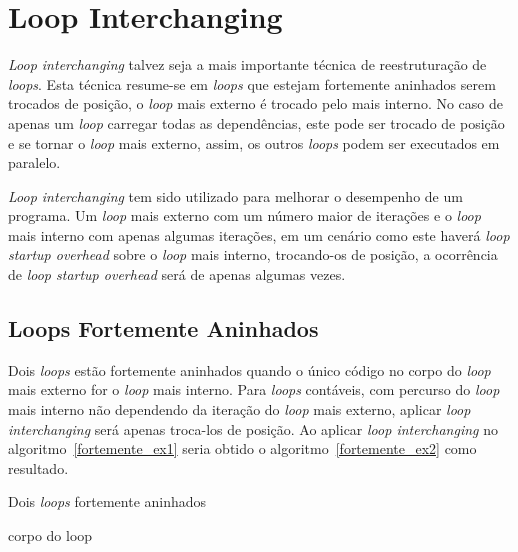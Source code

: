 \section{Loop Interchanging}

\textit{Loop interchanging} talvez seja a mais importante técnica de
reestruturação de \textit{loops}.
Esta técnica resume-se em \textit{loops} que estejam fortemente aninhados
serem trocados de posição, o \textit{loop} mais externo é trocado pelo mais
interno.
No caso de apenas um \textit{loop} carregar todas as dependências, este pode ser
trocado de posição e se tornar o \textit{loop} mais externo, assim, os outros
\textit{loops} podem ser executados em paralelo.

\textit{Loop interchanging} tem sido utilizado para melhorar o desempenho 
de um programa.
Um \textit{loop} mais externo com um número maior de iterações e o 
\textit{loop} mais interno com apenas algumas iterações, em um cenário como este
haverá \textit{loop startup overhead} sobre o \textit{loop} mais interno,
trocando-os de posição, a ocorrência de \textit{loop startup overhead} será de
apenas algumas vezes.

\subsection{Loops Fortemente Aninhados}

Dois \textit{loops} estão fortemente aninhados quando o único código no corpo do
\textit{loop} mais externo for o \textit{loop} mais interno.
Para \textit{loops} contáveis, com percurso do \textit{loop} mais interno não
dependendo da iteração do \textit{loop} mais externo, aplicar \textit{loop
interchanging} será apenas troca-los de posição.
Ao aplicar \textit{loop interchanging} no algoritmo~\ref{fortemente_ex1}
seria obtido o algoritmo~\ref{fortemente_ex2} como resultado.

\begin{algorithm}
\caption{Dois \textit{loops} fortemente aninhados}
\label{fortemente_ex1}
\begin{algorithmic}[1]

\STATE corpo do loop
\ENDFOR
\ENDFOR

\end{algorithmic}
\end{algorithm}


